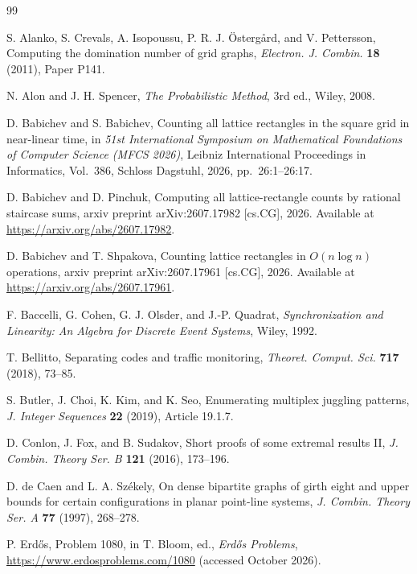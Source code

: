 \documentclass[12pt]{article}
\theoremstyle{plain}
\theoremstyle{definition}
\theoremstyle{remark}
\begin{document}
\begin{thebibliography}{99}

S. Alanko, S. Crevals, A. Isopoussu, P. R. J. \"Osterg\r{a}rd, and V. Pettersson,
Computing the domination number of grid graphs, \emph{Electron. J. Combin.}
\textbf{18} (2011), Paper P141.

N. Alon and J. H. Spencer, \emph{The Probabilistic Method}, 3rd ed., Wiley, 2008.

D. Babichev and S. Babichev, Counting all lattice rectangles in the square grid in
near-linear time, in \emph{51st International Symposium on Mathematical Foundations of
Computer Science (MFCS 2026)}, Leibniz International Proceedings in Informatics,
Vol.\ 386, Schloss Dagstuhl, 2026, pp.\ 26:1--26:17.

D. Babichev and D. Pinchuk, Computing all lattice-rectangle counts by rational
staircase sums, arxiv preprint arXiv:2607.17982 [cs.CG], 2026. Available at
\url{https://arxiv.org/abs/2607.17982}.

D. Babichev and T. Shpakova, Counting lattice rectangles in $O(n\log n)$ operations,
arxiv preprint arXiv:2607.17961 [cs.CG], 2026. Available at
\url{https://arxiv.org/abs/2607.17961}.

F. Baccelli, G. Cohen, G. J. Olsder, and J.-P. Quadrat, \emph{Synchronization and
Linearity: An Algebra for Discrete Event Systems}, Wiley, 1992.

T. Bellitto, Separating codes and traffic monitoring, \emph{Theoret. Comput. Sci.}
\textbf{717} (2018), 73--85.

S. Butler, J. Choi, K. Kim, and K. Seo, Enumerating multiplex juggling patterns,
\emph{J. Integer Sequences} \textbf{22} (2019), Article 19.1.7.

D. Conlon, J. Fox, and B. Sudakov, Short proofs of some extremal results II,
\emph{J. Combin. Theory Ser. B} \textbf{121} (2016), 173--196.

D. de Caen and L. A. Sz\'ekely, On dense bipartite graphs of girth eight and upper
bounds for certain configurations in planar point-line systems, \emph{J. Combin.
Theory Ser. A} \textbf{77} (1997), 268--278.

P. Erd\H{o}s, Problem 1080, in T. Bloom, ed., \emph{Erd\H{o}s Problems},
\url{https://www.erdosproblems.com/1080} (accessed October 2026).


\end{thebibliography}
\end{document}
